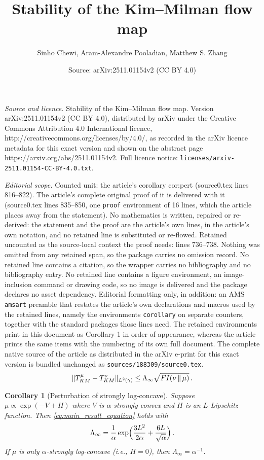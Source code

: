 \documentclass[10pt,a4paper]{amsart}
\title{Stability of the Kim--Milman flow map}
\author{Sinho Chewi, Aram-Alexandre Pooladian, Matthew S. Zhang}
\date{Source: arXiv:2511.01154v2 (CC BY 4.0)}
\newtheorem{corollary}{Corollary}
\newcommand{\mmid}{\,\Vert\,}
\begin{document}
\maketitle

\noindent\emph{Source and licence.} Stability of the Kim--Milman flow map. Version arXiv:2511.01154v2 (CC BY 4.0), distributed by arXiv under the Creative Commons Attribution 4.0 International licence, http://creativecommons.org/licenses/by/4.0/, as recorded in the arXiv licence metadata for this exact version and shown on the abstract page https://arxiv.org/abs/2511.01154v2. Full licence notice: \texttt{licenses/arxiv-2511.01154-CC-BY-4.0.txt}.\par\smallskip

\noindent\textit{Editorial scope.} Counted unit: the article's corollary cor:pert (source0.tex lines 816--822). The article's complete original proof of it is delivered with it (source0.tex lines 835--850, one \texttt{proof} environment of 16 lines, which the article places away from the statement). No mathematics is written, repaired or re-derived: the statement and the proof are the article's own lines, in the article's own notation, and no retained line is substituted or re-flowed.  Retained uncounted as the source-local context the proof needs: lines 736--738.  Nothing was omitted from any retained span, so the package carries no omission record.  No retained line contains a citation, so the wrapper carries no bibliography and no bibliography entry.  No retained line contains a figure environment, an image-inclusion command or drawing code, so no image is delivered and the package declares no asset dependency.  Editorial formatting only, in addition: an AMS \texttt{amsart} preamble that restates the article's own declarations and macros used by the retained lines, namely the environments \texttt{corollary} on separate counters, together with the standard packages those lines need.  The retained environments print in this document as Corollary 1 in order of appearance, whereas the article prints the same items with the numbering of its own full document.  The complete native source of the article as distributed in the arXiv e-print for this exact version is bundled unchanged as \texttt{sources/188309/source0.tex}.
\begin{align}\label{eq:main_result_equation}
    \|T_{\rm KM}^\mu - T_{\rm KM}^\nu\|_{L^2(\gamma)} \leq \Lambda_\infty \sqrt{{\rm FI}(\nu\mmid \mu)}\,.
\end{align}

\begin{corollary}[Perturbation of strongly log-concave]\label{cor:pert}
Suppose $\mu \propto\exp(-V{+}H)$ where $V$ is $\alpha$-strongly convex and $H$ is an $L$-Lipschitz function. {Then \eqref{eq:main_result_equation} holds with 
\begin{align*}
    \Lambda_\infty = \frac{1}{\alpha}\exp\Bigl(\frac{3L^2}{2\alpha} + \frac{6L}{\sqrt{\alpha}}\Bigr)\,.
\end{align*}
If $\mu$ is only $\alpha$-strongly log-concave (i.e., $H=0$), then $\Lambda_\infty = \alpha^{-1}$.}
\end{corollary}
\end{document}
